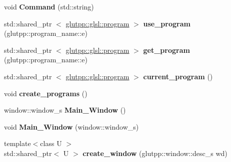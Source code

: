\begin{DoxyCompactItemize}
\item 
\hypertarget{classglutpp_1_1master_a69a240d5d10bd1282d60d390bde4a6c3}{void {\bfseries \-Command} (std\-::string)}\label{classglutpp_1_1master_a69a240d5d10bd1282d60d390bde4a6c3}

\item 
\hypertarget{classglutpp_1_1master_adf944b294dfa667ab320c291b0bec874}{std\-::shared\-\_\-ptr\*
$<$ \hyperlink{classglutpp_1_1glsl_1_1program}{glutpp\-::glsl\-::program} $>$ {\bfseries use\-\_\-program} (glutpp\-::program\-\_\-name\-::e)}\label{classglutpp_1_1master_adf944b294dfa667ab320c291b0bec874}

\item 
\hypertarget{classglutpp_1_1master_a98f2e11a5b87b6b4298cc3873c4f525f}{std\-::shared\-\_\-ptr\*
$<$ \hyperlink{classglutpp_1_1glsl_1_1program}{glutpp\-::glsl\-::program} $>$ {\bfseries get\-\_\-program} (glutpp\-::program\-\_\-name\-::e)}\label{classglutpp_1_1master_a98f2e11a5b87b6b4298cc3873c4f525f}

\item 
\hypertarget{classglutpp_1_1master_ad3c0bc9747d5da405283ff311716330f}{std\-::shared\-\_\-ptr\*
$<$ \hyperlink{classglutpp_1_1glsl_1_1program}{glutpp\-::glsl\-::program} $>$ {\bfseries current\-\_\-program} ()}\label{classglutpp_1_1master_ad3c0bc9747d5da405283ff311716330f}

\item 
\hypertarget{classglutpp_1_1master_ab476009c6503f6548a64dce36937b33e}{void {\bfseries create\-\_\-programs} ()}\label{classglutpp_1_1master_ab476009c6503f6548a64dce36937b33e}

\item 
\hypertarget{classglutpp_1_1master_a37a1fd8b933c2c60209638996b4da46a}{window\-::window\-\_\-s {\bfseries \-Main\-\_\-\-Window} ()}\label{classglutpp_1_1master_a37a1fd8b933c2c60209638996b4da46a}

\item 
\hypertarget{classglutpp_1_1master_af66d4b05d87fa96993bb4fc708ad9dca}{void {\bfseries \-Main\-\_\-\-Window} (window\-::window\-\_\-s)}\label{classglutpp_1_1master_af66d4b05d87fa96993bb4fc708ad9dca}

\item 
\hypertarget{classglutpp_1_1master_a49f7dc1063160596f0107701c5f3008b}{{\footnotesize template$<$class U $>$ }\\std\-::shared\-\_\-ptr$<$ \-U $>$ {\bfseries create\-\_\-window} (glutpp\-::window\-::desc\-\_\-s wd)}\label{classglutpp_1_1master_a49f7dc1063160596f0107701c5f3008b}


\end{DoxyCompactItemize}
